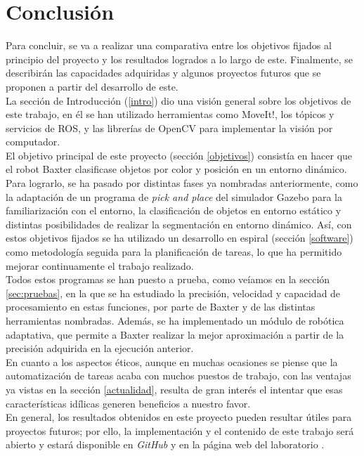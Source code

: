 \section{Conclusión}
\noindent Para concluir, se va a realizar una comparativa entre los objetivos fijados al principio del proyecto y los resultados logrados a lo largo de este. Finalmente, se describirán las capacidades adquiridas y algunos proyectos futuros que se proponen a partir del desarrollo de este. \\

\noindent La sección de Introducción (\ref{intro}) dio una visión general sobre los objetivos de este trabajo, en él se han utilizado herramientas como MoveIt!, los tópicos y servicios de ROS, y las librerías de OpenCV para implementar la visión por computador. \\
El objetivo principal de este proyecto (sección \ref{objetivos}) consistía en hacer que el robot Baxter clasificase objetos por color y posición en un entorno dinámico. Para lograrlo, se ha pasado por distintas fases ya nombradas anteriormente, como la adaptación de un programa de \textit{pick and place} del simulador Gazebo para la familiarización con el entorno, la clasificación de objetos en entorno estático y distintas posibilidades de realizar la segmentación en entorno dinámico. Así, con estos objetivos fijados se ha utilizado un desarrollo en espiral (sección \ref{software}) como metodología seguida para la planificación de tareas, lo que ha permitido mejorar continuamente el trabajo realizado. \\

\noindent Todos estos programas se han puesto a prueba, como veíamos en la sección \ref{sec:pruebas}, en la que se ha estudiado la precisión, velocidad y capacidad de procesamiento en estas funciones, por parte de Baxter y de las distintas herramientas nombradas. Además, se ha implementado un módulo de robótica adaptativa, que permite a Baxter realizar la mejor aproximación a partir de la precisión adquirida en la ejecución anterior. \\

\noindent En cuanto a los aspectos éticos, aunque en muchas ocasiones se piense que la automatización de tareas acaba con muchos puestos de trabajo, con las ventajas ya vistas en la sección \ref{actualidad}, resulta de gran interés el intentar que esas características idílicas generen beneficios a nuestro favor. \\

\noindent En general, los resultados obtenidos en este proyecto pueden resultar útiles para proyectos futuros; por ello, la implementación y el contenido de este trabajo será abierto y estará disponible en \textit{GitHub} \cite{crgh} y en la página web del laboratorio \cite{cvrlab}.

